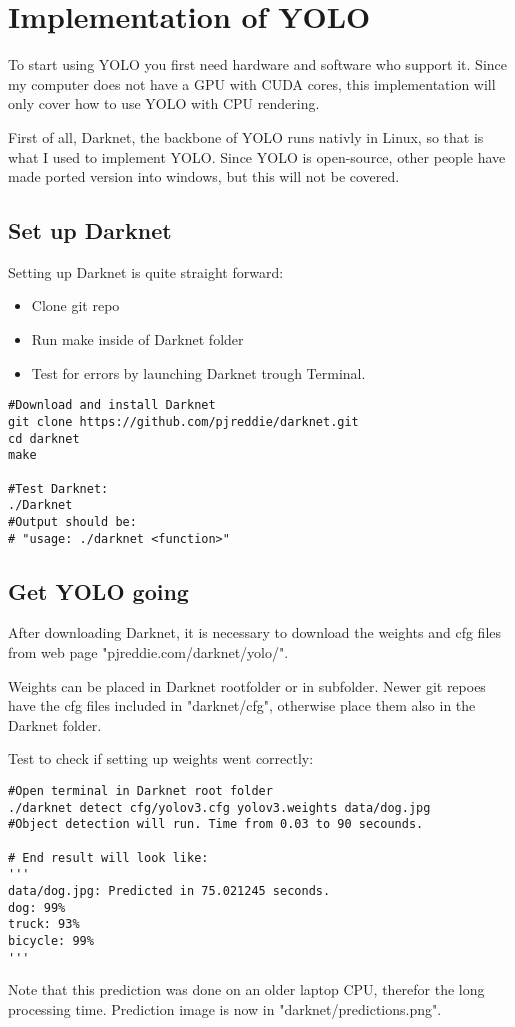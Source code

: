 \newpage

\section{Implementation of YOLO}
To start using YOLO you first need hardware and software who support it. Since my computer does not have a GPU with CUDA cores, this implementation will only cover how to use YOLO with CPU rendering. 

First of all, Darknet, the backbone of YOLO runs nativly in Linux, so that is what I used to implement YOLO. Since YOLO is open-source, other people have made ported version into windows, but this will not be covered.

\subsection{Set up Darknet}

Setting up Darknet is quite straight forward:
\begin{itemize}  
\item Clone git repo
\item Run make inside of Darknet folder
\item Test for errors by launching Darknet trough Terminal.  
\end{itemize}

\lstset{language=Python}
\begin{lstlisting}[frame=single]  
#Download and install Darknet
git clone https://github.com/pjreddie/darknet.git
cd darknet
make

#Test Darknet:
./Darknet
#Output should be:
# "usage: ./darknet <function>"
\end{lstlisting}


\subsection{Get YOLO going}\label{getYOLOgoing}
After downloading Darknet, it is necessary to download the weights and cfg files from web page "pjreddie.com/darknet/yolo/".

Weights can be placed in Darknet rootfolder or in subfolder. Newer git repoes have the cfg files included in "darknet/cfg", otherwise place them also in the Darknet folder.

Test to check if setting up weights went correctly:
\begin{lstlisting}[frame=single]  
#Open terminal in Darknet root folder
./darknet detect cfg/yolov3.cfg yolov3.weights data/dog.jpg
#Object detection will run. Time from 0.03 to 90 secounds.

# End result will look like:
'''
data/dog.jpg: Predicted in 75.021245 seconds.
dog: 99%
truck: 93%
bicycle: 99%
'''
\end{lstlisting}
Note that this prediction was done on an older laptop CPU, therefor the long processing time. 
Prediction image is now in "darknet/predictions.png".

